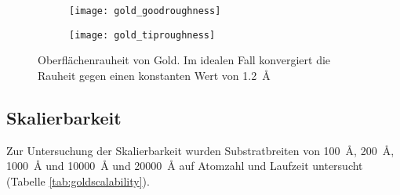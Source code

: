 \begin{figure}[bth]
  \captionsetup[subfigure]{singlelinecheck=false}
  \def\subfigwidth{0.49\textwidth}

  \begin{subfigure}[t]{\subfigwidth}
    \texttt{[image: gold\_goodroughness]}
    \label{fig:goldroughness-a}
  \end{subfigure}
  \hfill
  \begin{subfigure}[t]{\subfigwidth}
    \texttt{[image: gold\_tiproughness]}
    \label{fig:goldroughness-b}
  \end{subfigure}

  \caption[Oberflächenrauheit von Gold]{Oberflächenrauheit von Gold. Im idealen Fall konvergiert die Rauheit gegen einen konstanten Wert von \SI{1.2}{\angstrom}}
  \label{fig:goldroughness}

\end{figure}

\subsection{Skalierbarkeit}

Zur Untersuchung der Skalierbarkeit wurden Substratbreiten von \SI{100}{\angstrom}, \SI{200}{\angstrom}, \SI{1000}{\angstrom} und \SI{10000}{\angstrom} und \SI{20000}{\angstrom} auf Atomzahl und Laufzeit untersucht (Tabelle \ref{tab:goldscalability}).



